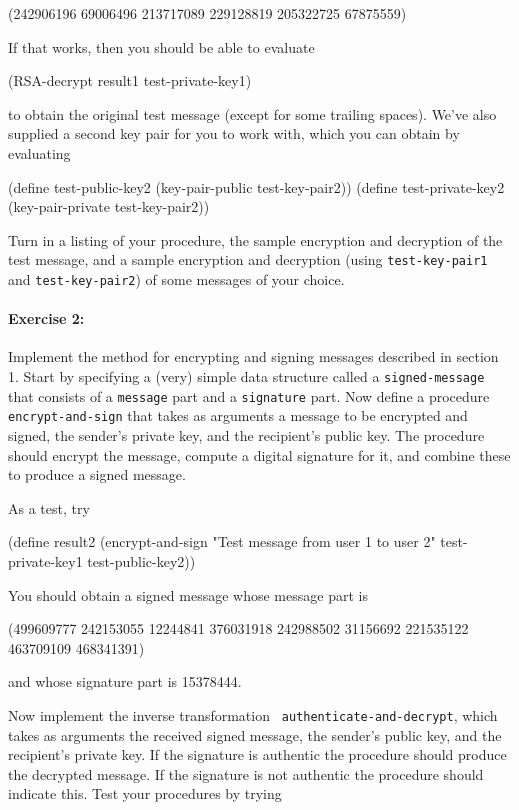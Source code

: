 \beginlisp
(242906196 69006496 213717089 229128819 205322725 67875559)
\endlisp

\noindent If that works, then you should be able to evaluate

\beginlisp
(RSA-decrypt result1 test-private-key1)
\endlisp

\noindent
to obtain the original test message (except for some
trailing spaces).  We've also supplied a second key pair for you to
work with, which you can obtain by evaluating

\beginlisp
(define test-public-key2 (key-pair-public test-key-pair2))
(define test-private-key2 (key-pair-private test-key-pair2))
\endlisp

\noindent
Turn in a listing of your procedure, the sample encryption
and decryption of the test message, and a sample encryption and
decryption (using {\tt test-key-pair1} and {\tt test-key-pair2}) of
some messages of your choice.

\paragraph{Exercise 2:}
Implement the method for encrypting and signing messages described in
section 1.  Start by specifying a (very) simple data structure called
a {\tt signed-message} that consists of a {\tt message} part and a
{\tt signature} part.  Now define a procedure {\tt encrypt-and-sign}
that takes as arguments a message to be encrypted and signed, the
sender's private key, and the recipient's public key.  The procedure
should encrypt the message, compute a digital signature for it, and
combine these to produce a signed message.

As a test, try

\beginlisp
(define result2
  (encrypt-and-sign "Test message from user 1 to user 2"
                    test-private-key1
                    test-public-key2))
\endlisp

\noindent
You should obtain a signed message whose message part is

\beginlisp
(499609777 242153055 12244841 376031918 242988502 31156692 221535122 463709109 468341391)
\endlisp

\noindent
and whose signature part is  15378444.

Now implement the inverse transformation {\tt
authenticate-and-decrypt}, which takes as arguments the received
signed message, the sender's public key, and the recipient's private
key.  If the signature is authentic the procedure should produce the
decrypted message.  If the signature is not authentic the procedure
should indicate this.  Test your procedures by trying

